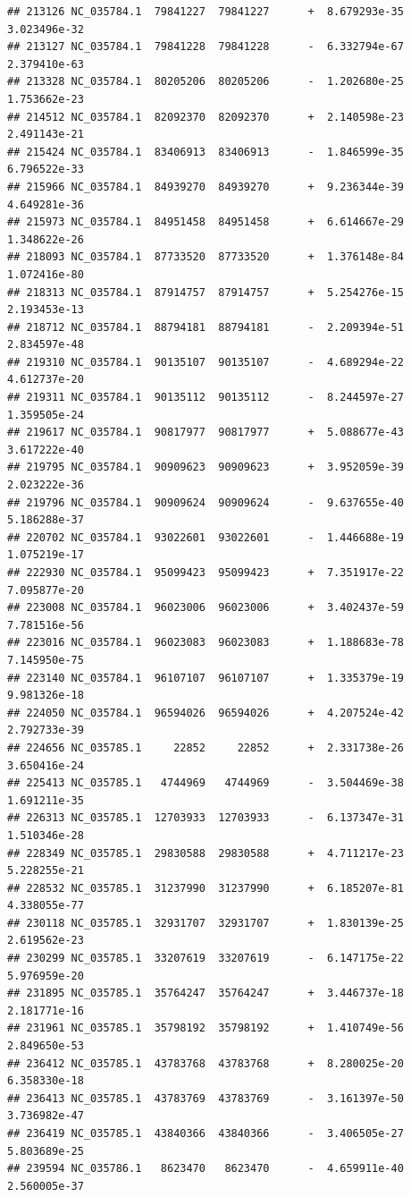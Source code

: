 \documentclass[]{article}
\begin{document}
\begin{verbatim}
## 213126 NC_035784.1  79841227  79841227      +  8.679293e-35  3.023496e-32
## 213127 NC_035784.1  79841228  79841228      -  6.332794e-67  2.379410e-63
## 213328 NC_035784.1  80205206  80205206      -  1.202680e-25  1.753662e-23
## 214512 NC_035784.1  82092370  82092370      +  2.140598e-23  2.491143e-21
## 215424 NC_035784.1  83406913  83406913      -  1.846599e-35  6.796522e-33
## 215966 NC_035784.1  84939270  84939270      +  9.236344e-39  4.649281e-36
## 215973 NC_035784.1  84951458  84951458      +  6.614667e-29  1.348622e-26
## 218093 NC_035784.1  87733520  87733520      +  1.376148e-84  1.072416e-80
## 218313 NC_035784.1  87914757  87914757      +  5.254276e-15  2.193453e-13
## 218712 NC_035784.1  88794181  88794181      -  2.209394e-51  2.834597e-48
## 219310 NC_035784.1  90135107  90135107      -  4.689294e-22  4.612737e-20
## 219311 NC_035784.1  90135112  90135112      -  8.244597e-27  1.359505e-24
## 219617 NC_035784.1  90817977  90817977      +  5.088677e-43  3.617222e-40
## 219795 NC_035784.1  90909623  90909623      +  3.952059e-39  2.023222e-36
## 219796 NC_035784.1  90909624  90909624      -  9.637655e-40  5.186288e-37
## 220702 NC_035784.1  93022601  93022601      -  1.446688e-19  1.075219e-17
## 222930 NC_035784.1  95099423  95099423      +  7.351917e-22  7.095877e-20
## 223008 NC_035784.1  96023006  96023006      +  3.402437e-59  7.781516e-56
## 223016 NC_035784.1  96023083  96023083      +  1.188683e-78  7.145950e-75
## 223140 NC_035784.1  96107107  96107107      +  1.335379e-19  9.981326e-18
## 224050 NC_035784.1  96594026  96594026      +  4.207524e-42  2.792733e-39
## 224656 NC_035785.1     22852     22852      +  2.331738e-26  3.650416e-24
## 225413 NC_035785.1   4744969   4744969      -  3.504469e-38  1.691211e-35
## 226313 NC_035785.1  12703933  12703933      -  6.137347e-31  1.510346e-28
## 228349 NC_035785.1  29830588  29830588      +  4.711217e-23  5.228255e-21
## 228532 NC_035785.1  31237990  31237990      +  6.185207e-81  4.338055e-77
## 230118 NC_035785.1  32931707  32931707      +  1.830139e-25  2.619562e-23
## 230299 NC_035785.1  33207619  33207619      -  6.147175e-22  5.976959e-20
## 231895 NC_035785.1  35764247  35764247      +  3.446737e-18  2.181771e-16
## 231961 NC_035785.1  35798192  35798192      +  1.410749e-56  2.849650e-53
## 236412 NC_035785.1  43783768  43783768      +  8.280025e-20  6.358330e-18
## 236413 NC_035785.1  43783769  43783769      -  3.161397e-50  3.736982e-47
## 236419 NC_035785.1  43840366  43840366      -  3.406505e-27  5.803689e-25
## 239594 NC_035786.1   8623470   8623470      -  4.659911e-40  2.560005e-37

\end{verbatim}
\end{document}
